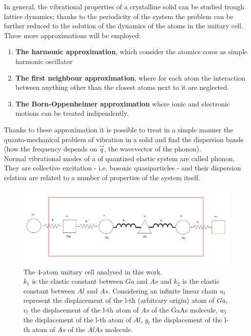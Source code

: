 \documentclass{article}
\begin{document}
	In general, the vibrational properties of a crystalline solid can be studied trough lattice dynamics; thanks to the periodicity of the system the problem can be further reduced to the solution of the dynamics of the atoms in the unitary cell.\\
	Three more approximations will be employed:
	\begin{enumerate}
		\item \textbf{The harmonic approximation}, which consider the atomics cores as simple harmonic oscillator
		\item \textbf{The first neighbour approximation}, where for each atom the interaction between anything other than the closest atoms next to it are neglected.
		\item \textbf{The Born-Oppenheimer approximation} where ionic and electronic motions can be treated indipendently.
	\end{enumerate}
	Thanks to these approximation it is possible to treat in a simple manner the quanto-mechanical problem of vibration in a solid and find the dispersion bands (how the frequency depends on $\vec{q}$, the wavevector of the phonon).\\
Normal vibrational modes of a of quantized elastic system are called phonon. They are collective excitation - i.e. bosonic quasiparticles - and their dispersion relation are related to a number of properties of the system itself. \smallskip 

\begin{figure}
	\centering
	\includegraphics[width=0.7\linewidth]{cella.png}
	\caption{The 4-atom unitary cell analysed in this work.\\
	$k_1$ is the elastic constant between $Ga$ and $As$ and $k_2$ is the elastic constant between $Al$ and $As$. Considering an infinite linear chain $u_l$ represent the displacement of the l-th (arbitrary origin) atom of $Ga$, $v_l$ the displacement of the l-th atom of $As$ of the GaAs molecule, $w_l$ the displacement of the l-th atom of $Al$, $y_l$ the displacement of the l-th atom of $As$ of the $AlAs$ molecule.   }
	\label{fig:cella}
\end{figure}
\end{document}

